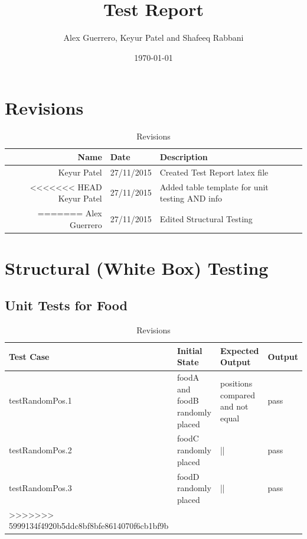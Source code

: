 \documentclass[12pt]{article}
\begin{document}
\title{Test Report} 
\author{Alex Guerrero, Keyur Patel and Shafeeq Rabbani}
\date{\today}

\maketitle

\section{Revisions}
\begin{center}
	\begin{longtable}{ | r | p{4cm} | p{4cm} | p{4cm} |}
	\caption{Revisions} \\ \hline \label{TblInputVar} 
	Name & Date & Description\\ \hline
	Keyur Patel & 27/11/2015 &  Created Test Report latex file\\ \hline
<<<<<<< HEAD
	Keyur Patel & 27/11/2015 &  Added table template for unit testing AND info\\ \hline
=======
	Alex Guerrero & 27/11/2015 & Edited Structural Testing\\ \hline
	\end{longtable}
\end{center}

\section{Structural (White Box) Testing}

\subsection{Unit Tests for Food}

\begin{center}
	\begin{longtable}{ | p{3cm} | p{4cm} | p{4cm} | p{2cm} |}
	\caption{Revisions} \\ \hline \label{TblInputVar} 
	Test Case & Initial State & Expected Output & Output\\ \hline
	testRandomPos.1 & foodA and foodB randomly placed & positions compared and not equal & pass  \\ \hline
	testRandomPos.2 & foodC randomly placed & || & pass  \\ \hline
	testRandomPos.3 & foodD randomly placed & || & pass  \\ \hline
>>>>>>> 5999134f4920b5ddc8bf8bfe8614070f6cb1bf9b
	\end{longtable}
\end{center}
\end{document}
